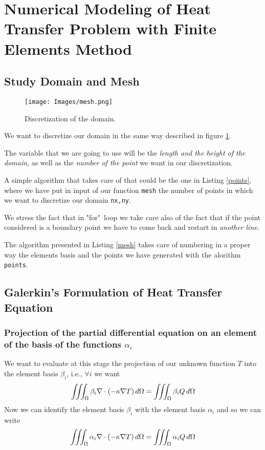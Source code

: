 
\section{Numerical Modeling of Heat Transfer Problem with Finite Elements Method}
\subsection{Study Domain and Mesh}
\label{sec:4.1}
\begin{figure}
	\centering
	\texttt{[image: Images/mesh.png]}
	\caption{Discretization of the domain.}
	\label{figure:mesh}
\end{figure}
\begin{mdframed}
	We want to discretize our domain in the same way described in figure \ref{figure:mesh}.
	
	The variable that we are going to use will be the \emph{length and the height of the domain}, as well as the \emph{number of the point} we want in our discretization. 
	
	A simple algorithm that takes care of that could be the one in Listing \ref{points}, where we have put in input of our function \texttt{mesh} the number of points in which we want to discretize our domain \texttt{nx,ny}.   
	
	We stress the fact that in "for"~loop we take care also of the fact that if the point considered is a boundary point we have to come back and restart in \emph{another line}.
	
	The algorithm presented in Listing \ref{mesh} takes care of numbering in a proper way the elements basis and the points we have generated with the alorithm \texttt{points}.
	
\end{mdframed}
\subsection{Galerkin’s Formulation of Heat Transfer Equation}
\subsubsection{Projection of the partial differential equation on an element of the basis of the functions $ \alpha_i $}
We want to evaluate at this stage the projection of our unknown function $ T $ into the element basis $ \beta_i $, i.e., $ \forall i $ we want 
\begin{equation}
\label{eq:proj}
\iiint_{\Omega}\beta_i\nabla\cdot(-\kappa\nabla T)\mathop{}\!d\Omega=\iiint_{\Omega}\beta_i Q\mathop{}\!d\Omega
\end{equation} 
Now we can identify the element basis $ \beta_i $ with the element basis $ \alpha_i $ and so we can write  
\[\iiint_{\Omega}\alpha_i\nabla\cdot(-\kappa\nabla T)\mathop{}\!d\Omega=\iiint_{\Omega}\alpha_i Q\mathop{}\!d\Omega \]

